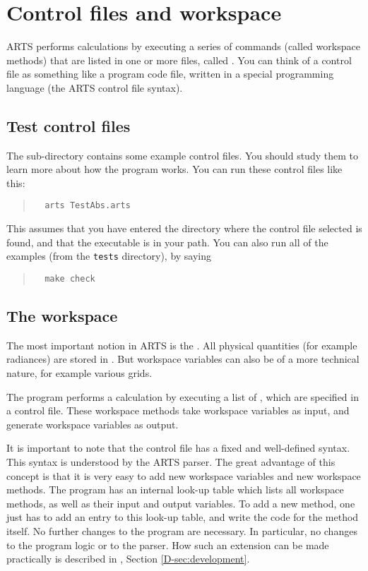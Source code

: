 \section{Control files and workspace}

ARTS performs calculations by executing a series of commands (called
workspace methods) that are listed in one or more files, called
. You can think of a control file as something like a
program code file, written in a special programming language (the ARTS
control file syntax).

\subsection{Test control files}

The sub-directory  contains some example control files.
You should study them to learn more about how the program works. You
can run these control files like this:
\begin{quote}
\begin{verbatim}
  arts TestAbs.arts
\end{verbatim}
\end{quote}
This assumes that you have entered the directory where the control
file selected is found, and that the  executable is in
your path. You can also run all of the examples (from the \verb|tests|
directory), by saying
\begin{quote}
\begin{verbatim}
  make check
\end{verbatim}
\end{quote}


\subsection{The workspace}

The most important notion in ARTS is the . All
physical quantities (for example radiances) are stored in
. But workspace variables can also be
of a more technical nature, for example various grids.

The program performs a calculation by executing a list of
, which are specified in a control file.
These workspace methods take workspace variables as input, and
generate workspace variables as output.

It is important to note that the control file has a fixed and
well-defined syntax. This syntax is understood by the ARTS parser.
The great advantage of this concept is that it is very easy to add new
workspace variables and new workspace methods. The program has an
internal look-up table which lists all workspace methods, as well as
their input and output variables. To add a new method, one just has to
add an entry to this look-up table, and write the code for the method
itself. No further changes to the program are necessary. In
particular, no changes to the program logic or to the parser. How such
an extension can be made practically is described in \developer, Section
\ref{D-sec:development}.



